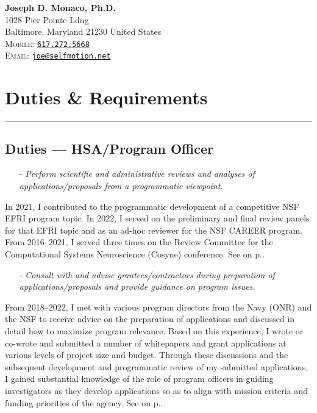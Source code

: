 \documentclass[10pt]{article}
\newcommand{\cf}[1]{\textcolor{hopkinsblue}{See \emph{\nameref{sec:#1}} on p.\pageref{sec:#1}}}
\begin{document}
\begin{center}
  \textbf{\LARGE\color{hopkinsblue} Joseph D. Monaco, Ph.D.} \\[0.1in]
  1028 Pier Pointe Ldng \\
  Baltimore, Maryland 21230 United States \\
  \textsc{Mobile:} \href{tel:16172725668}{\color{hopkinsblue}\texttt{617.272.5668}} \\
  \textsc{Email:} \href{mailto:joe@selfmotion.net}{\color{hopkinsblue}\texttt{joe@selfmotion.net}}
  \vspace{.1in}
\end{center}

\vspace{-.2in}
\section*{Duties \& Requirements}
\vspace{-.1in}
\hrule
\vspace{.3in}

\subsection*{Duties --- HSA/Program Officer}
\label{sec:duties}

\begin{itemize}
  \item[-] \emph{Perform scientific and administrative reviews and analyses of
    applications/proposals from a programmatic viewpoint.}
\end{itemize}

In 2021, I contributed to the programmatic development of a competitive NSF EFRI
program topic. In 2022, I served on the preliminary and final review panels
for that EFRI topic and as an ad-hoc reviewer for the NSF CAREER program. From
2016--2021, I served three times on the Review Committee for the Computational
Systems Neuroscience (Cosyne) conference. \cf{service}.

\begin{itemize}
  \item[-] \emph{Consult with and advise grantees/contractors during preparation
    of applications/proposals and provide guidance on program issues.}
\end{itemize}

From 2018--2022, I met with various program directors from the Navy (ONR) and
the NSF to receive advice on the preparation of applications and discussed in
detail how to maximize program relevance. Based on this experience, I wrote or
co-wrote and submitted a number of whitepapers and grant applications at various
levels of project size and budget. Through these discussions and the subsequent
development and programmatic review of my submitted applications, I gained
substantial knowledge of the role of program officers in guiding investigators
as they develop applications so as to align with mission criteria and funding
priorities of the agency. \cf{resprogram}.
\end{document}
